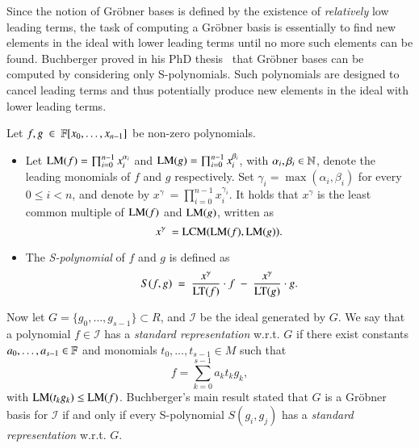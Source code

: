 Since the notion of Gr\"obner bases is defined by the existence of {\it relatively} low leading terms, the task of computing a Gr\"obner basis is essentially to find new elements in the ideal with lower leading terms until no more such elements can be found. Buchberger proved in his PhD thesis~\cite{Buchberger65} that Gr\"obner bases can be computed by considering only S-polynomials. Such polynomials are designed to cancel leading terms and thus potentially produce new elements in the ideal with lower leading terms.
\begin{definition}[S-Polynomial]
\label{def:spolynomials}
Let $f,g\ \in\ {\mathbb F}[x_0,\dots,x_{n-1}]$ be non-zero polynomials.
\begin{itemize}
\item Let $\textsc{LM}(f) = \prod_{i=0}^{n-1} x_i^{\alpha_i}$ and $\textsc{LM}(g) = \prod_{i=0}^{n-1} x_i^{\beta_i}$, with $\alpha_i,\beta_i \in {\mathbb N}$, denote the leading monomials
of $f$ and $g$ respectively.
Set $\gamma_i = \max(\alpha_i,\beta_i)$ for every $0 \leq  i < n$, and denote by $x^\gamma\ = \prod_{i=0}^{n-1} x_i^{\gamma_i}$.  
It holds that $x^\gamma$ is the least common multiple of
$\textsc{LM}(f)$ and $\textsc{LM}(g)$, written as $$x^\gamma\ =\textsc{LCM}(\textsc{LM}(f),\textsc{LM}(g)).$$  
\item The {\it S-polynomial} of $f$ and $g$ is defined as
$$
S(f,g)\ =\ \frac{x^\gamma}{\textsc{LT}(f)}\cdot f\ -\
\frac{x^\gamma}{\textsc{LT}(g)}\cdot g.
$$
\end{itemize}
\end{definition}

Now let $G=\{g_0,\ldots, g_{s-1}\} \subset R$, and $\mathcal{I}$ be the ideal generated by $G$.
We say that a polynomial $f \in \mathcal{I}$ has a {\it standard representation} w.r.t. $G$ if 
there exist constants $a_0,\ldots, a_{s-1} \in {\mathbb F}$ and monomials $t_0,\ldots, t_{s-1} \in M$ such that     
$$
f=\sum_{k=0}^{s-1}a_k t_k g_k, 
$$    
with $\textsc{LM}(t_k g_k) \leq \textsc{LM}(f)$. Buchberger's main result stated that $G$ is a Gr\"obner basis for $\mathcal{I}$ if and only if every 
S-polynomial $S(g_i,g_j)$ has a  {\it standard representation} w.r.t. $G$.

